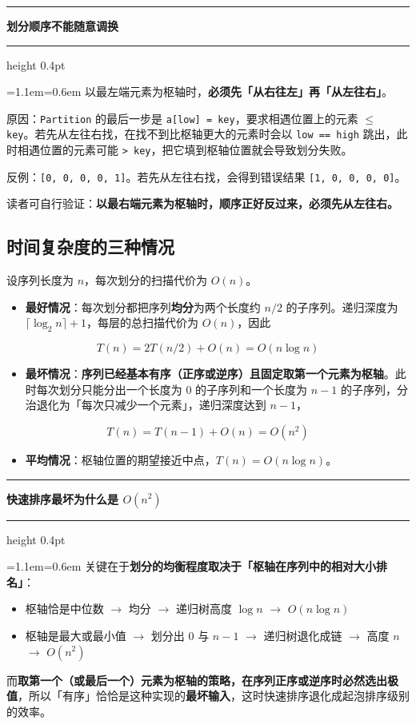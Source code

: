 \documentclass[11pt,openany,UTF8]{ctexbook}
\newcommand{\callouthead}[2]{%
  \par\addvspace{7pt}\noindent
  {\color{#1}\rule[-0.15em]{3pt}{1.05em}}\hspace{0.5em}%
  {\bfseries\color{#1}#2}\par\nobreak\vspace{-0.35em}%
  {\color{rulesep}\hrule height 0.4pt}\nobreak\vspace{0.45em}%
  \begingroup\small\setlength{\parindent}{0pt}%
  \leftskip=1.1em\rightskip=0.6em\noindent\ignorespaces}
\newcommand{\calloutend}{\par\endgroup\addvspace{7pt}}
\newenvironment{callkey}[1]{\callouthead{keybar}{#1}}{\calloutend}
\newenvironment{callwarn}[1]{\callouthead{warnbar}{#1}}{\calloutend}
\begin{document}
\begin{callwarn}{划分顺序不能随意调换}
以最左端元素为枢轴时，\textbf{必须先「从右往左」再「从左往右」}。

原因：\texttt{Partition} 的最后一步是 \texttt{a[low]\allowbreak{} =\allowbreak{} key}，要求相遇位置上的元素 \texttt{$\le$ key}。若先从左往右找，在找不到比枢轴更大的元素时会以 \texttt{low =\allowbreak{}=\allowbreak{} high} 跳出，此时相遇位置的元素可能 \texttt{>\allowbreak{} key}，把它填到枢轴位置就会导致划分失败。

反例：\texttt{[0,\allowbreak{} 0,\allowbreak{} 0,\allowbreak{} 0,\allowbreak{} 1]\allowbreak{}}。若先从左往右找，会得到错误结果 \texttt{[1,\allowbreak{} 0,\allowbreak{} 0,\allowbreak{} 0,\allowbreak{} 0]\allowbreak{}}。

读者可自行验证：\textbf{以最右端元素为枢轴时，顺序正好反过来，必须先从左往右。}

\end{callwarn}

\subsection{时间复杂度的三种情况}

设序列长度为 $n$，每次划分的扫描代价为 $O(n)$。

\begin{itemize}
\item \textbf{最好情况}：每次划分都把序列\textbf{均分}为两个长度约 $n/2$ 的子序列。递归深度为 $\lceil\log_2 n\rceil +1$，每层的总扫描代价为 $O(n)$，因此
\end{itemize}
\[T(n)=2T(n/2)+O(n)=O(n\log n)\]

\begin{itemize}
\item \textbf{最坏情况}：\textbf{序列已经基本有序（正序或逆序）且固定取第一个元素为枢轴}。此时每次划分只能分出一个长度为 0 的子序列和一个长度为 $n-1$ 的子序列，分治退化为「每次只减少一个元素」，递归深度达到 $n-1$，
\end{itemize}
\[T(n)=T(n-1)+O(n)=O(n^2)\]

\begin{itemize}
\item \textbf{平均情况}：枢轴位置的期望接近中点，$T(n)=O(n\log n)$。
\end{itemize}
\begin{callkey}{快速排序最坏为什么是 $O(n^2)$}
关键在于\textbf{划分的均衡程度取决于「枢轴在序列中的相对大小排名」}：

\begin{itemize}
\item 枢轴恰是中位数 $\to$ 均分 $\to$ 递归树高度 $\log n$ $\to$ $O(n\log n)$
\item 枢轴是最大或最小值 $\to$ 划分出 0 与 $n-1$ $\to$ 递归树退化成链 $\to$ 高度 $n$ $\to$ $O(n^2)$
\end{itemize}
而\textbf{取第一个（或最后一个）元素为枢轴的策略，在序列正序或逆序时必然选出极值}，所以「有序」恰恰是这种实现的\textbf{最坏输入}，这时快速排序退化成起泡排序级别的效率。

\end{callkey}
\end{document}
